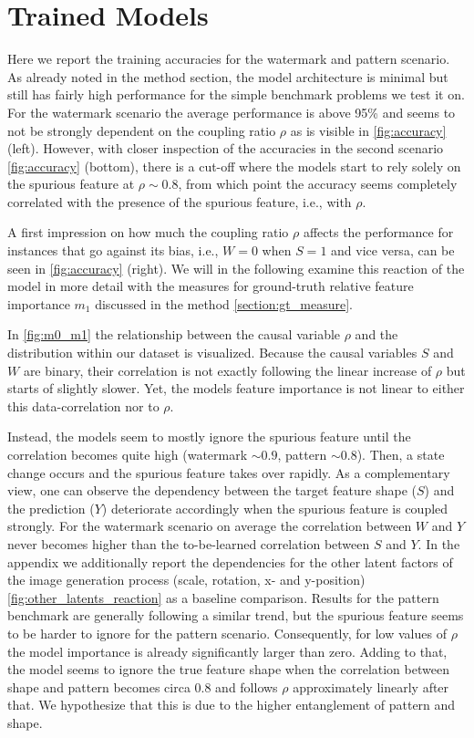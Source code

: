 \section{Trained Models}
Here we report the training accuracies for the watermark and pattern scenario. 
As already noted in the method section, the model architecture is minimal but still has fairly high performance for the simple benchmark problems we test it on. 
For the watermark scenario the average performance is above 95\% and seems to not be strongly dependent on the coupling ratio $\rho$ as is visible in \cref{fig:accuracy} (left).
However, with closer inspection of the accuracies in the second scenario \cref{fig:accuracy} (bottom), there is a cut-off where the models start to rely solely on the spurious feature at $\rho \sim 0.8$, from which point the accuracy seems completely correlated with the presence of the spurious feature, i.e., with $\rho$.

A first impression on how much the coupling ratio $\rho$ affects the performance for instances that go against its bias, i.e., $W=0$ when $S=1$ and vice versa, can be seen in \cref{fig:accuracy} (right). We will in the following examine this reaction of the model in more detail with the measures for ground-truth relative feature importance $m_1$ discussed in the method \cref{section:gt_measure}. 

In \cref{fig:m0_m1} the relationship between the causal variable $\rho$ and the distribution within our dataset is visualized. Because the causal variables $S$ and $W$ are binary, their correlation is not exactly following the linear increase of $\rho$ but starts of slightly slower. Yet, the models feature importance is not linear to either this data-correlation nor to $\rho$.

Instead, the models seem to mostly ignore the spurious feature until the correlation becomes quite high (watermark $\sim 0.9$, pattern $\sim 0.8$). Then, a state change  occurs and the spurious feature takes over rapidly. As a complementary view, one can observe the dependency between the target feature shape ($S$) and the prediction ($Y$) deteriorate accordingly when the spurious feature is coupled strongly. For the watermark scenario on average the correlation between $W$ and $Y$ never becomes higher than the to-be-learned correlation between $S$ and $Y$. In the appendix we additionally report the dependencies for the other latent factors of the image generation process (scale, rotation, x- and y-position) \cref{fig:other_latents_reaction} as a baseline comparison.
Results for the pattern benchmark are generally following a similar trend, but the spurious feature seems to be harder to ignore for the pattern scenario. Consequently, for low values of $\rho$ the model importance is already significantly larger than zero. Adding to that, the model seems to ignore the true feature shape when the correlation between shape and pattern becomes circa 0.8 and follows $\rho$ approximately linearly after that. We hypothesize that this is due to the higher entanglement of pattern and shape. 

